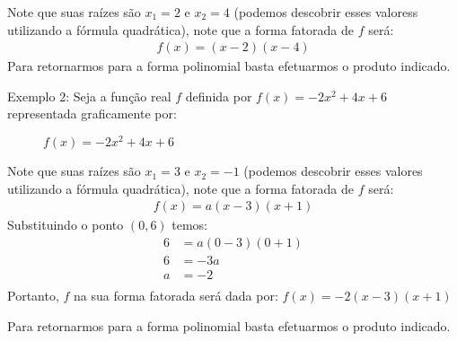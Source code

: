 Note que suas raízes são \(x_1=2\) e \(x_2=4\) (podemos descobrir esses valoress utilizando a fórmula quadrática), note que a forma fatorada de \(f\) será:
\begin{equation*}
\begin{split}f(x)=(x-2)(x-4)\end{split}
\end{equation*}
Para retornarmos para a forma polinomial basta efetuarmos o produto indicado.

Exemplo 2: Seja a função real \(f\) definida por \(f(x) = -2x^2 +4x + 6\) representada graficamente por:
\begin{figure}[H]
\centering

\caption{\(f(x) = -2x^2 +4x + 6\)}
\end{figure}

Note que suas raízes são \(x_1=3\) e \(x_2=-1\) (podemos descobrir esses valores utilizando a fórmula quadrática), note que a forma fatorada de \(f\) será:
\begin{equation*}
\begin{split}f(x)=a(x-3)(x+1)\end{split}
\end{equation*}
Substituindo o ponto \((0,6)\) temos:
\begin{align*}
6&=a(0-3)(0+1)\\
6&=-3a\\
a&=-2\\
\end{align*}
Portanto, \(f\) na sua forma fatorada será dada por: \(f(x)=-2(x-3)(x+1)\)

Para retornarmos para a forma polinomial basta efetuarmos o produto indicado.

